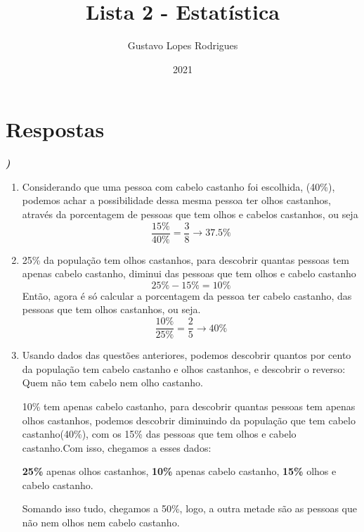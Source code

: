 \documentclass[12pt]{article}
\title{\textbf{Lista 2 - Estatística}}
\author{Gustavo Lopes Rodrigues}
\date{2021}
\newcounter{instn}
\newcommand{\instnum}{\arabic{instn}}
\newcommand{\myline}[1]{
    \emph{\textbf{#1)}}
    \addtocounter{instn}{1}
}
\newenvironment{question}
 {
    \myline{\instnum} 
    }
    {
 }
\begin{document}
    
    \maketitle

    \section*{Respostas}


    \begin{question}
        \begin{enumerate}[label={\textbf{\alph*)}}]
            \item Considerando que uma pessoa com cabelo castanho foi escolhida,
            (40\%), podemos achar a possibilidade dessa mesma pessoa ter olhos castanhos,
            através da porcentagem de pessoas que tem olhos e cabelos castanhos, ou seja
            \begin{equation}
                \frac{15\%}{40\%} = \frac{3}{8} \rightarrow 37.5\%
            \end{equation}

            \item 25\% da população tem olhos castanhos, para descobrir quantas pessoas tem apenas 
            cabelo castanho, diminui das pessoas que tem olhos e cabelo castanho \[25\% - 15\% = 10\%\]
            Então, agora é só calcular a porcentagem da pessoa ter cabelo castanho, das pessoas que tem olhos
            castanhos, ou seja.
            \begin{equation}
                \frac{10\%}{25\%} = \frac{2}{5} \rightarrow 40\%
            \end{equation}

            \item Usando dados das questões anteriores, podemos descobrir quantos por cento da população 
            tem cabelo castanho e olhos castanhos, e descobrir o reverso: Quem não tem cabelo nem olho castanho.

            10\% tem apenas cabelo castanho, para descobrir quantas pessoas tem apenas olhos castanhos, 
            podemos descobrir diminuindo da população que tem cabelo castanho(40\%), com os 15\% das pessoas que tem
            olhos e cabelo castanho.Com isso, chegamos a esses dados: 
            \begin{center}
                \textbf{25\%} apenas olhos castanhos, \textbf{10\%} apenas cabelo castanho, \textbf{15\%} olhos e cabelo castanho. 
            \end{center}

            Somando isso tudo, chegamos a 50\%, logo, a outra metade são as pessoas que não nem olhos nem cabelo castanho.

        \end{enumerate}
    \end{question}
\end{document}
